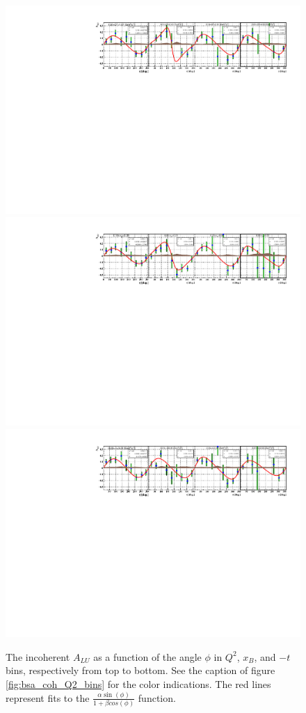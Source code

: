 \begin{figure}[tpb]
\includegraphics[scale=0.72]{fig_updated/f_incoh_alu_Q2_phi.pdf}
\includegraphics[scale=0.72]{fig_updated/f_incoh_alu_xB_phi.pdf}
\includegraphics[scale=0.72]{fig_updated/f_incoh_alu_t_phi.pdf}
\caption{The incoherent $A_{LU}$ as a function of the angle $\phi$ in $Q^2$, 
   $x_B$, and $-t$ bins, respectively from top to bottom. See the caption of 
figure \ref{fig:bsa_coh_Q2_bins} for the color indications. The red lines 
represent fits to the $\frac{\alpha \sin(\phi)}{1 + \beta cos(\phi)}$ function.  
} \label{fig:bsa_incoh_bins}
\end{figure}

